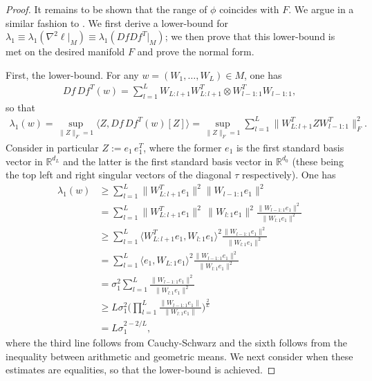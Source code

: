 \documentclass{article}
\newcommand{\RB}{\mathbb{R}}
\theoremstyle{plain}
\theoremstyle{definition}
\theoremstyle{remark}
\begin{document}
\begin{proof}
    It remains to be shown that the range of $\phi$ coincides with $F$. We argue in a similar fashion to \cite{mulayoff2}. We first derive a lower-bound for $\lambda_1\equiv\lambda_1(\nabla^2\ell|_M)\equiv\lambda_1(DfDf^T|_M)$; we then prove that this lower-bound is met on the desired manifold $F$ and prove the normal form.
    
    First, the lower-bound. For any $w = (W_1,\dots,W_L)\in M$, one has 
    \begin{align}
    Df\,Df^T(w) = \sum_{l=1}^LW_{L:l+1}W_{L:l+1}^T\otimes W_{l-1:1}^TW_{l-1:1},
    \end{align}
    so that 
    \begin{align}
    \lambda_1(w) = \sup_{\|Z\|_F = 1}\langle Z,Df\,Df^T(w)[Z]\rangle = \sup_{\|Z\|_F=1}
\sum_{l=1}^L\|W_{L:l+1}^TZW_{l-1:1}^T\|_F^2.
    \end{align}
    Consider in particular $Z:=e_1\,e_1^T$, where the former $e_1$ is the first standard basis vector in $\RB^{d_L}$ and the latter is the first standard basis vector in $\RB^{d_0}$ (these being the top left and right singular vectors of the diagonal $\tau$ respectively). One has
    \begin{align}
    \lambda_1(w)&\geq \sum_{l=1}^L\|W_{L:l+1}^Te_1\|^2\|W_{l-1:1}e_1\|^2\nonumber\\ &=\sum_{l=1}^L\|W_{L:l+1}^Te_1\|^2\,\|W_{l:1}e_1\|^2\frac{\|W_{l-1:1}e_1\|^2}{\|W_{l:1}e_1\|^2}\nonumber\\&\geq \sum_{l=1}^L\langle W_{L:l+1}^Te_1,W_{l:1}e_1\rangle^2\frac{\|W_{l-1:1}e_1\|^2}{\|W_{l:1}e_1\|^2}\nonumber\\& = \sum_{l=1}^L\langle e_1,W_{L:1}e_1\rangle^2\frac{\|W_{l-1:1}e_1\|^2}{\|W_{l:1}e_1\|^2}\nonumber\\&=\sigma_1^2\sum_{l=1}^L\frac{\|W_{l-1:1}e_1\|^2}{\|W_{l:1}e_1\|^2}\nonumber\\&\geq L\sigma_1^2\bigg(\prod_{l=1}^L\frac{\|W_{l-1:1}e_1\|}{\|W_{l:1}e_1\|}\bigg)^{\frac{2}{L}}\\& = L\sigma_1^{2-2/L},\label{eq:lowerbound}
    \end{align}
    where the third line follows from Cauchy-Schwarz and the sixth follows from the inequality between arithmetic and geometric means. We next consider when these estimates are equalities, so that the lower-bound is achieved.


\end{proof}
\end{document}
